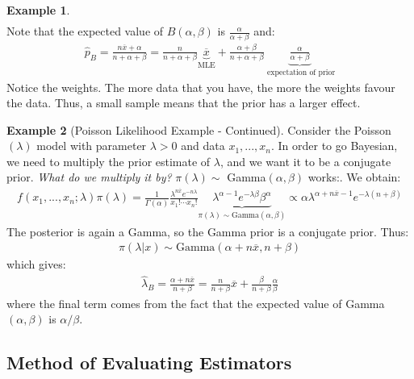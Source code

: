 \documentclass[11pt]{scrartcl}
\theoremstyle{definition}
\newtheorem{ex}{Example}
\theoremstyle{remark}
\begin{document}
\begin{ex}
\begin{align*}
	\end{align*}
	Note that the expected value of $B(\alpha, \beta)$ is $\frac{\alpha}{\alpha + \beta}$ and: 
	\begin{align*}
		\hat{p}_B  = \frac{n\overline{x} + \alpha}{n + \alpha + \beta} = \frac{n}{n + \alpha + \beta} \underbrace{\overline{x}}_{\text{MLE}} + \frac{\alpha + \beta}{n + \alpha + \beta} \underbrace{\frac{\alpha}{\alpha + \beta}}_{\text{ expectation of prior}}	
	\end{align*}
	Notice the weights. The more data that you have, the more the weights favour the data. Thus, a small sample means that the prior has a larger effect. 
\end{ex}

\begin{ex}[Poisson Likelihood Example - Continued]
	Consider the Poisson$(\lambda)$ model with parameter $\lambda > 0$ and data $x_1, ..., x_n$. In order to go Bayesian, we need to multiply the prior estimate of $\lambda$, and we want it to be a conjugate prior. \emph{What do we multiply it by?} $\pi(\lambda) \sim$ Gamma$(\alpha, \beta)$ works:. We obtain: 
	\begin{align}
		f(x_1, ..., x_n; \lambda) \pi(\lambda) = 
		\frac{1}{\Gamma(\alpha)} \frac{\lambda^{n \overline{x}} e^{-n \lambda}}{x_1! \cdots x_n!} \underbrace{\lambda^{\alpha-1} e^{-\lambda \beta} \beta^\alpha}_{\pi(\lambda) \sim \text{Gamma}(\alpha, \beta)} \propto \alpha \lambda^{\alpha + n \overline{x} - 1} e^{-\lambda (n + \beta)}
	\end{align}
	The posterior is again a Gamma, so the Gamma prior is a conjugate prior. Thus: 
	\begin{align*}
		\pi(\lambda | x ) \sim \text{Gamma}(\alpha + n \overline{x}, n + \beta) 	
	\end{align*}
	which gives: 
	\begin{align*}
		\hat{\lambda}_B = \frac{\alpha + n \overline{x}}{n + \beta} = \frac{n}{n+\beta} \overline{x} + \frac{\beta}{n+ \beta} \frac{\alpha}{\beta}	
	\end{align*}
	where the final term comes from the fact that the expected value of Gamma$(\alpha, \beta)$ is $\alpha / \beta$. 

\end{ex}


\subsection{Method of Evaluating Estimators}
\end{document}
